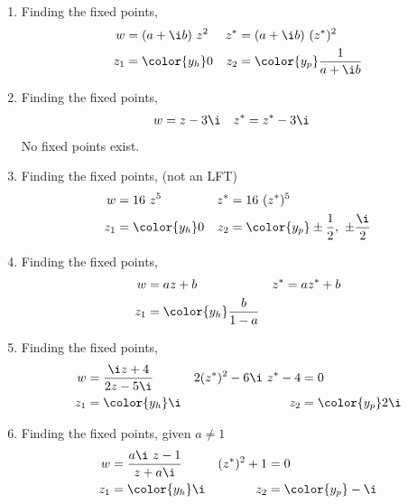 \begin{enumerate}
    \item Finding the fixed points,
          \begin{align}
              w   & = (a + \i b)\ z^2                &
              z^* & = (a + \i b)\ (z^*)^2              \\
              z_1 & = \color{y_h} 0                  &
              z_2 & = \color{y_p} \frac{1}{a + \i b}
          \end{align}

    \item Finding the fixed points,
          \begin{align}
              w   & = z - 3\i   &
              z^* & = z^* - 3\i
          \end{align}
          No fixed points exist.

    \item Finding the fixed points, (not an LFT)
          \begin{align}
              w   & = 16\ z^5                                        &
              z^* & = 16\ (z^*)^5                                      \\
              z_1 & = \color{y_h} 0                                  &
              z_2 & = \color{y_p} \pm \frac{1}{2},\ \pm \frac{\i}{2}
          \end{align}

    \item Finding the fixed points,
          \begin{align}
              w   & = az + b                    &
              z^* & = az^* + b                    \\
              z_1 & = \color{y_h} \frac{b}{1-a}
          \end{align}

    \item Finding the fixed points,
          \begin{align}
              w                       & = \frac{\i z + 4}{2z - 5\i} &
              2(z^*)^2 - 6\i\ z^* - 4 & = 0                           \\
              z_1                     & = \color{y_h} \i            &
              z_2                     & = \color{y_p} 2\i
          \end{align}

    \item Finding the fixed points, given $ a \neq 1 $
          \begin{align}
              w           & = \frac{a\i\ z - 1}{z + a\i} &
              (z^*)^2 + 1 & = 0                            \\
              z_1         & = \color{y_h} \i             &
              z_2         & = \color{y_p} -\i
          \end{align}


\end{enumerate}
